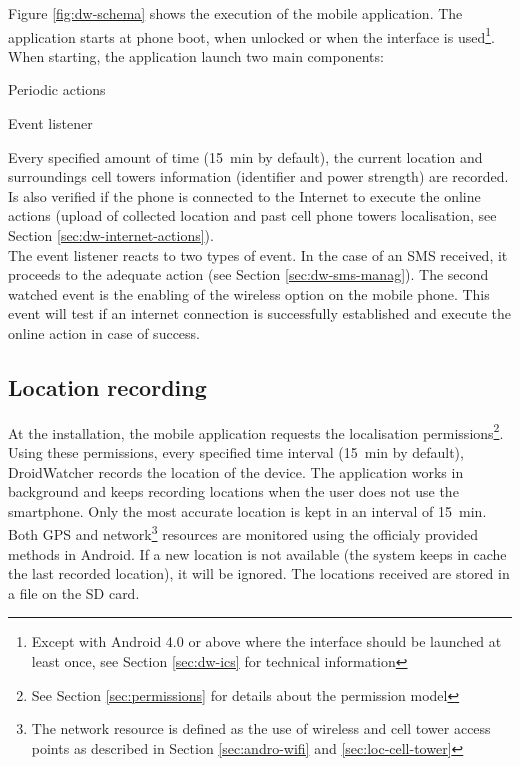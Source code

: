 Figure \ref{fig:dw-schema} shows the execution of the mobile application.
The application starts at phone boot, when unlocked or when the interface is used\footnote{Except with Android 4.0 or above where the interface should be launched at least once, see Section \ref{sec:dw-ics} for technical information}.
When starting, the application launch two  main components:

\begin{itemizealt}
\item Periodic actions
\item Event listener
\end{itemizealt}

Every specified amount of time (15~min by default), the current location and surroundings cell towers information (identifier and power strength) are recorded.
Is also verified if the phone is connected to the Internet to execute the online actions (upload of collected location and past cell phone towers localisation, see Section \ref{sec:dw-internet-actions}).\\

The event listener reacts to two types of event.
In the case of an SMS received, it proceeds to the adequate action (see Section \ref{sec:dw-sms-manag}).
The second watched event is the enabling of the wireless option on the mobile phone.
This event will test if an internet connection is successfully established and execute the online action in case of success.

\subsection{Location recording}

At the installation, the mobile application requests the localisation permissions\footnote{See Section \ref{sec:permissions} for details about the permission model}.
Using these permissions, every specified time interval (15~min by default), DroidWatcher records the location of the device.
The application works in background and keeps recording locations when the user does not use the smartphone.
Only the most accurate location is kept in an interval of 15~min.
Both GPS and network\footnote{The network resource is defined as the use of wireless and cell tower access points as described in Section \ref{sec:andro-wifi} and \ref{sec:loc-cell-tower}} resources are monitored using the officialy provided methods in Android.
If a new location is not available (the system keeps in cache the last recorded location), it will be ignored.
The locations received are stored in a file on the SD card.\\

